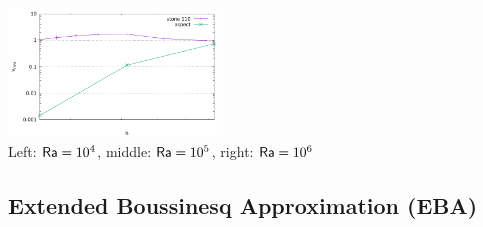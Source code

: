 \begin{center}
\includegraphics[width=5.7cm]{python_codes/fieldstone_110/results_BA/slopes/q_1e6_conv}\\
{\captionfont Left: ${\mathsf{Ra}}=10^4$, middle: ${\mathsf{Ra}}=10^5$, right: ${\mathsf{Ra}}=10^6$} 
\end{center}


\newpage
\subsection*{Extended Boussinesq Approximation (EBA)}

